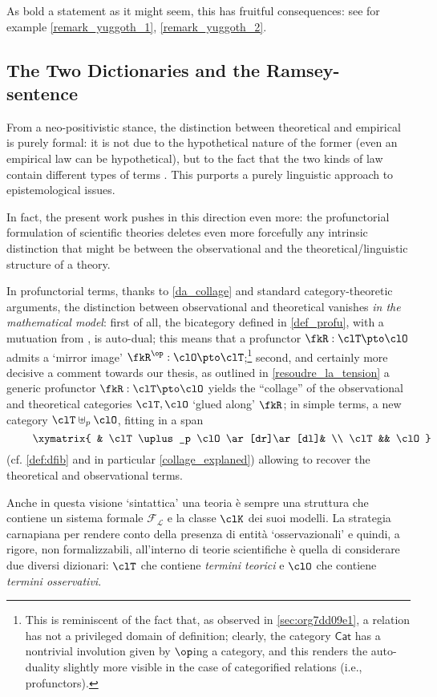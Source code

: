As bold a statement as it might seem, this has fruitful consequences: see for example \autoref{remark_yuggoth_1}, \autoref{remark_yuggoth_2}.

\subsection{The Two Dictionaries and the Ramsey-sentence}
From a neo-positivistic stance, the distinction between theoretical and empirical is purely formal: it is not due to the hypothetical nature of the former (even an empirical law can be hypothetical), but to the fact that the two kinds of law contain different types of terms \cite{carnapfound}. This purports a purely linguistic approach to epistemological issues. 

In fact, the present work pushes in this direction even more: the profunctorial formulation of scientific theories deletes even more forcefully any intrinsic distinction that might be between the observational and the theoretical\fshyp{}linguistic structure of a theory.

In profunctorial terms, thanks to \autoref{da_collage} and standard category\hyp{}theoretic arguments, the distinction between observational and theoretical vanishes \emph{in the mathematical model}: first of all, the bicategory defined in \autoref{def_profu}, with a mutuation from \cite{benabou2000distributors}, is auto-dual; this means that a profunctor $\fkR : \clT \pto \clO$ admits a `mirror image' $\fkR^\op : \clO \pto \clT$;\footnote{This is reminiscent of the fact that, as observed in \autoref{sec:org7dd09e1}, a relation has not a privileged domain of definition; clearly, the category $\mathsf{Cat}$ has a nontrivial involution given by $\op$ing a category, and this renders the auto-duality slightly more visible in the case of categorified relations (i.e., profunctors).} second, and certainly more decisive a comment towards our thesis, as outlined in \autoref{resoudre_la_tension} a generic profunctor $\fkR : \clT \pto\clO$ yields the ``collage'' of the observational and theoretical categories $\clT,\clO$ `glued along' $\fkR$; in simple terms, a new category $\clT\uplus_p\clO$, fitting in a span 
\[ \vcenter{\xymatrix{
	& \clT\uplus_p \clO \ar[dr]\ar[dl]& \\ 
	\clT  && \clO 
}} \] (cf. \autoref{def:dfib} and in particular \autoref{collage_explaned}) allowing to recover the theoretical and observational terms.
\color{blue!40}
\begin{remark}\label{hint_at_collage}
	Anche in questa visione `sintattica' \cite{giunti2016} una teoria è sempre una struttura che contiene un sistema formale $\mathcal{F_L}$ e la classe $\clK$ dei suoi modelli. La strategia carnapiana per rendere conto della presenza di entità `osservazionali' e quindi, a rigore, non formalizzabili, all'interno di teorie scientifiche è quella di considerare due diversi dizionari: $\clT$ che contiene \emph{termini teorici} e $\clO$ che contiene \emph{termini osservativi}. 
\end{remark}


